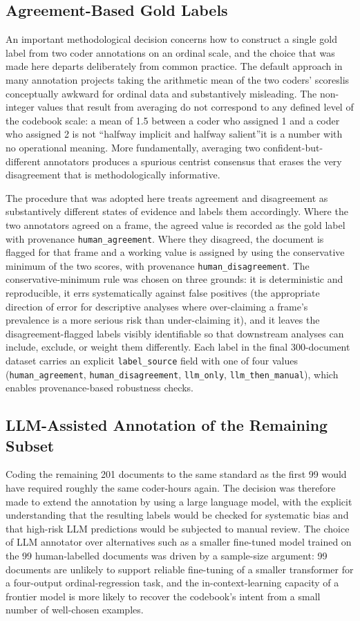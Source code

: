 \documentclass[12pt, journal]{IEEEtran}
\begin{document}
\subsection{Agreement-Based Gold Labels}
An important methodological decision concerns how to construct a single gold label from two coder annotations on an ordinal scale, and the choice that was made here departs deliberately from common practice. The default approach in many annotation projects taking the arithmetic mean of the two coders' scoreslis conceptually awkward for ordinal data and substantively misleading. The non-integer values that result from averaging do not correspond to any defined level of the codebook scale: a mean of 1.5 between a coder who assigned 1 and a coder who assigned 2 is not ``halfway implicit and halfway salient''it is a number with no operational meaning. More fundamentally, averaging two confident-but-different annotators produces a spurious centrist consensus that erases the very disagreement that is methodologically informative.

The procedure that was adopted here treats agreement and disagreement as substantively different states of evidence and labels them accordingly. Where the two annotators agreed on a frame, the agreed value is recorded as the gold label with provenance \texttt{human\_agreement}. Where they disagreed, the document is flagged for that frame and a working value is assigned by using the conservative minimum of the two scores, with provenance \texttt{human\_disagreement}. The conservative-minimum rule was chosen on three grounds: it is deterministic and reproducible, it errs systematically against false positives (the appropriate direction of error for descriptive analyses where over-claiming a frame's prevalence is a more serious risk than under-claiming it), and it leaves the disagreement-flagged labels visibly identifiable so that downstream analyses can include, exclude, or weight them differently. Each label in the final 300-document dataset carries an explicit \texttt{label\_source} field with one of four values (\texttt{human\_agreement}, \texttt{human\_disagreement}, \texttt{llm\_only}, \texttt{llm\_then\_manual}), which enables provenance-based robustness checks.

\subsection{LLM-Assisted Annotation of the Remaining Subset}
Coding the remaining 201 documents to the same standard as the first 99 would have required roughly the same coder-hours again. The decision was therefore made to extend the annotation by using a large language model, with the explicit understanding that the resulting labels would be checked for systematic bias and that high-risk LLM predictions would be subjected to manual review. The choice of LLM annotator over alternatives such as a smaller fine-tuned model trained on the 99 human-labelled documents was driven by a sample-size argument: 99 documents are unlikely to support reliable fine-tuning of a smaller transformer for a four-output ordinal-regression task, and the in-context-learning capacity of a frontier model is more likely to recover the codebook's intent from a small number of well-chosen examples.
\end{document}
